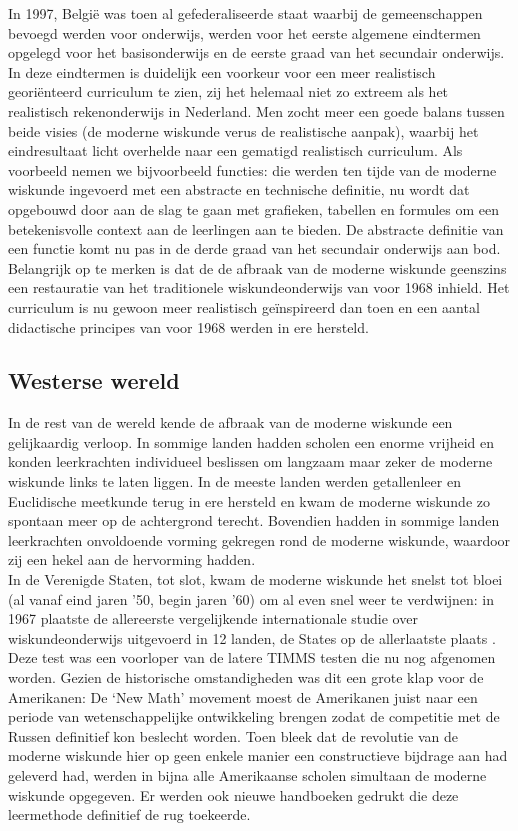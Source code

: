 \documentclass[a4paper,11pt]{article}
\begin{document}
\noindent In 1997, België was toen al gefederaliseerde staat waarbij de gemeenschappen bevoegd 
werden voor onderwijs, werden voor het eerste algemene eindtermen opgelegd voor 
het basisonderwijs en de eerste graad van het secundair onderwijs. In deze 
eindtermen is duidelijk een voorkeur voor een meer realistisch georiënteerd 
curriculum te zien, zij het helemaal niet zo extreem als het realistisch 
rekenonderwijs in Nederland. Men zocht meer een goede balans tussen beide visies 
(de moderne wiskunde verus de realistische aanpak), waarbij het eindresultaat licht 
overhelde naar een gematigd realistisch curriculum. Als voorbeeld nemen we 
bijvoorbeeld functies: die werden ten tijde van de moderne wiskunde ingevoerd 
met een abstracte en technische definitie, nu wordt dat opgebouwd door aan de 
slag te gaan met grafieken, tabellen en formules om een betekenisvolle context 
aan de leerlingen aan te bieden. De abstracte definitie van een functie komt nu 
pas in de derde graad van het secundair onderwijs aan bod.\\

\noindent Belangrijk op te merken is dat de de afbraak van de moderne wiskunde geenszins 
een restauratie van het traditionele wiskundeonderwijs van voor 1968 inhield. 
Het curriculum is nu gewoon meer realistisch geïnspireerd dan toen en een aantal 
didactische principes van voor 1968 werden in ere hersteld.

\subsection{Westerse wereld}
In de rest van de wereld kende de afbraak van de moderne wiskunde een 
gelijkaardig verloop. In sommige landen hadden scholen een enorme vrijheid en 
konden leerkrachten individueel beslissen om langzaam maar zeker de moderne 
wiskunde links te laten liggen. In de meeste landen werden getallenleer en 
Euclidische meetkunde terug in ere hersteld en kwam de moderne wiskunde zo 
spontaan meer op de achtergrond terecht. Bovendien hadden in sommige landen 
leerkrachten onvoldoende vorming gekregen rond de moderne wiskunde, waardoor zij 
een hekel aan de hervorming hadden.\\

\noindent In de Verenigde Staten, tot slot, kwam de moderne wiskunde het snelst 
tot bloei (al vanaf eind jaren '50, begin jaren '60) om al even snel weer te verdwijnen: 
in 1967 plaatste de allereerste vergelijkende internationale studie over 
wiskundeonderwijs uitgevoerd in 12 landen, de States op de allerlaatste plaats \cite{20}. 
Deze test was een voorloper van de latere TIMMS testen die nu nog afgenomen 
worden.
Gezien de historische omstandigheden was dit een grote klap voor de Amerikanen:
De `New Math' movement moest de Amerikanen juist naar een periode van 
wetenschappelijke ontwikkeling brengen zodat de competitie met de Russen 
definitief kon beslecht worden. Toen bleek dat de revolutie van de moderne 
wiskunde hier op geen enkele manier een constructieve bijdrage aan had geleverd had, 
werden in bijna alle Amerikaanse scholen simultaan de moderne wiskunde 
opgegeven. Er werden ook nieuwe handboeken gedrukt die deze leermethode 
definitief de rug toekeerde. \\
\end{document}
